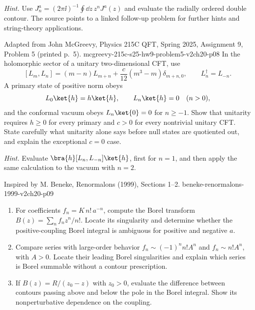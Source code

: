 \begin{enumerate}
\begin{enumerate}
    \emph{Hint.} Use
    \(J_n^a=(2\pi \ii)^{-1}\oint \dd z\,z^nJ^a(z)\) and evaluate the
    radially ordered double contour.  The source points to a linked
    follow-up problem for further hints and string-theory applications.
  \end{enumerate}

  {Adapted from John McGreevy, Physics 215C QFT, Spring 2025,
  Assignment 9, Problem 5 (printed p.~5).}
  {mcgreevy-215c-s25-hw9-problem5-v2ch20-p08}
  In the holomorphic sector of a unitary two-dimensional CFT, use
  \[
    [L_m,L_n]=(m-n)L_{m+n}
      +\frac{c}{12}(m^3-m)\delta_{m+n,0},
    \qquad
    L_n^\dagger=L_{-n}.
    \tag{20.8.1}
  \]
  A primary state of positive norm obeys
  \[
    L_0\ket{h}=h\ket{h},\qquad
    L_n\ket{h}=0\quad(n>0),
  \]
  and the conformal vacuum obeys \(L_n\ket{0}=0\) for \(n\geq-1\).
  Show that unitarity requires \(h\geq0\) for every primary and
  \(c>0\) for every nontrivial unitary CFT.  State carefully what
  unitarity alone says before null states are quotiented out, and explain
  the exceptional \(c=0\) case.

  \emph{Hint.} Evaluate
  \(\bra{h}[L_n,L_{-n}]\ket{h}\), first for \(n=1\), and then apply
  the same calculation to the vacuum with \(n=2\).

  {Inspired by M. Beneke, Renormalons (1999), Sections 1--2.}
  {beneke-renormalons-1999-v2ch20-p09}
  \begin{enumerate}
    \item[(a)]
    For coefficients \(f_n=K\,n!\,a^{-n}\), compute the Borel transform
    \(B(z)=\sum_nf_nz^n/n!\).  Locate its singularity and determine whether
    the positive-coupling Borel integral is ambiguous for positive and
    negative \(a\).
    \item[(b)]
    Compare series with large-order behavior
    \(f_n\sim(-1)^n n!A^n\) and \(f_n\sim n!A^n\), with \(A>0\).
    Locate their leading Borel singularities and explain which series is
    Borel summable without a contour prescription.
    \item[(c)]
    If \(B(z)=R/(z_0-z)\) with \(z_0>0\), evaluate the difference between
    contours passing above and below the pole in the Borel integral.
    Show its nonperturbative dependence on the coupling.
  \end{enumerate}


\end{enumerate}
